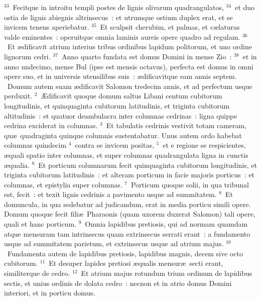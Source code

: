 ${}^{33}$~Fecitque in introitu templi postes de lignis olivarum quadrangulatos,
${}^{34}$~et duo ostia de lignis abiegnis altrinsecus~: et utrumque ostium duplex erat, et se invicem tenens aperiebatur.
${}^{35}$~Et sculpsit cherubim, et palmas, et c\ae laturas valde eminentes~: operuitque omnia laminis aureis opere quadro ad regulam.
${}^{36}$~Et \ae dificavit atrium interius tribus ordinibus lapidum politorum, et uno ordine lignorum cedri.
${}^{37}$~Anno quarto fundata est domus Domini in mense Zio~:
${}^{38}$~et in anno undecimo, mense Bul (ipse est mensis octavus), perfecta est domus in omni opere suo, et in universis utensilibus suis~: \ae dificavitque eam annis septem.
~\lettrine[lines=10,image=true,loversize=0.05,lraise=-0.03]{D}{}omum autem suam \ae dificavit Salomon tredecim annis, et ad perfectum usque perduxit.
${}^{2}$~\AE dificavit quoque domum saltus Libani centum cubitorum longitudinis, et quinquaginta cubitorum latitudinis, et triginta cubitorum altitudinis~: et quatuor deambulacra inter columnas cedrinas~: ligna quippe cedrina exciderat in columnas.
${}^{3}$~Et tabulatis cedrinis vestivit totam cameram, qu\ae\ quadraginta quinque columnis sustentabatur. Unus autem ordo habebat columnas quindecim
${}^{4}$~contra se invicem positas,
${}^{5}$~et e regione se respicientes, \ae quali spatio inter columnas, et super columnas quadrangulata ligna in cunctis \ae qualia.
${}^{6}$~Et porticum columnarum fecit quinquaginta cubitorum longitudinis, et triginta cubitorum latitudinis~: et alteram porticum in facie majoris porticus~: et columnas, et epistylia super columnas.
${}^{7}$~Porticum quoque solii, in qua tribunal est, fecit~: et texit lignis cedrinis a pavimento usque ad summitatem.
${}^{8}$~Et domuncula, in qua sedebatur ad judicandum, erat in media porticu simili opere. Domum quoque fecit fili\ae\ Pharaonis (quam uxorem duxerat Salomon) tali opere, quali et hanc porticum.
${}^{9}$~Omnia lapidibus pretiosis, qui ad normam quamdam atque mensuram tam intrinsecus quam extrinsecus serrati erant~: a fundamento usque ad summitatem parietum, et extrinsecus usque ad atrium majus.
${}^{10}$~Fundamenta autem de lapidibus pretiosis, lapidibus magnis, decem sive octo cubitorum.
${}^{11}$~Et desuper lapides pretiosi \ae qualis mensur\ae\ secti erant, similiterque de cedro.
${}^{12}$~Et atrium majus rotundum trium ordinum de lapidibus sectis, et unius ordinis de dolata cedro~: necnon et in atrio domus Domini interiori, et in porticu domus.


